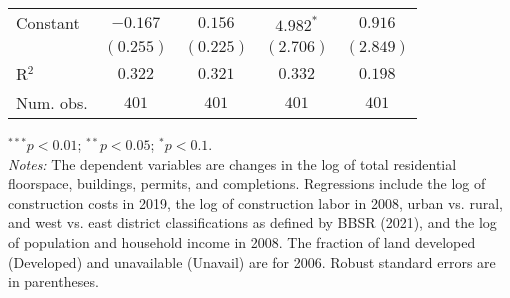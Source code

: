 \begin{table}[H]
\begin{center}
\begin{footnotesize}
\begin{threeparttable}
\begin{tabular}{l c c c c}
Constant                    & $-0.167$       & $0.156$        & $4.982^{*}$    & $0.916$        \\
                            & $(0.255)$      & $(0.225)$      & $(2.706)$      & $(2.849)$      \\
\midrule
R$^2$                       & $0.322$        & $0.321$        & $0.332$        & $0.198$        \\
Num. obs.                   & $401$          & $401$          & $401$          & $401$          \\
\bottomrule
\end{tabular}
\begin{tablenotes}[flushleft]
\tiny{\item $^{***}p<0.01$; $^{**}p<0.05$; $^{*}p<0.1$. \\ \textit{Notes:} The dependent variables are changes in the log of total residential floorspace, buildings, permits, and completions. Regressions include the log of construction costs in 2019, the log of construction labor in 2008, urban vs. rural, and west vs. east district classifications as defined by BBSR (2021), and the log of population and household income in 2008. The fraction of land developed (Developed) and unavailable (Unavail) are for 2006. Robust standard errors are in parentheses.}
\end{tablenotes}
\end{threeparttable}
\end{footnotesize}
\label{tab:ols-results--all-checked}
\end{center}
\end{table}

